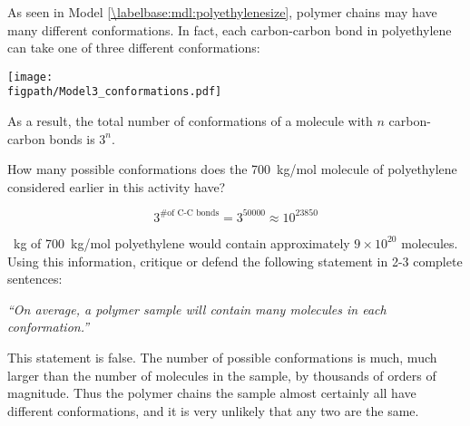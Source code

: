 \begin{activity}
\begin{ctqs}
\end{ctqs}



\begin{model}
	\label{\labelbase:mdl:conformations}

	As seen in Model \ref{\labelbase:mdl:polyethylenesize}, polymer chains may have many different conformations.  In fact, each carbon-carbon bond in polyethylene can take one of three different conformations:
	
	\vspace{6pt}
	\centerline{\texttt{[image: \\figpath/Model3\_conformations.pdf]}}
	
	As a result, the total number of conformations of a molecule with $n$ carbon-carbon bonds is $3^n$.

\end{model}

\begin{ctqs}

	\question How many possible conformations does the 700~kg/mol molecule of polyethylene considered earlier in this activity have?
	
		\begin{solution}[1in]
			\begin{equation*}
				3^{\text{\# of C-C bonds}} = 3^{50000} \approx 10^{23850}
			\end{equation*}
		\end{solution}
	
	~kg of 700~kg/mol polyethylene would contain approximately $9\times 10^{20}$ molecules.  Using this information, critique or defend the following statement in 2-3 complete sentences:
	
		\emph{``On average, a polymer sample will contain many molecules in each conformation.''}
	
		\begin{solution}[2.5in]
		
			This statement is false.  The number of possible conformations is much, much larger than the number of molecules in the sample, by thousands of orders of magnitude.  Thus the polymer chains the sample almost certainly all have different conformations, and it is very unlikely that any two are the same.
		\end{solution}
		
\end{ctqs}


\begin{exercises}


\end{exercises}
\end{activity}
